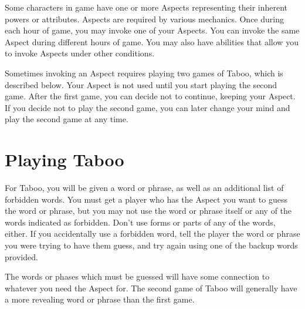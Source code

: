 \documentclass[green]{guardians}
\begin{document}
\name{\gAspect{}}

Some characters in game have one or more Aspects representing their inherent powers or attributes. Aspects are required by various mechanics. Once during each hour of game, you may invoke one of your Aspects. You can invoke the same Aspect during different hours of game. You may also have abilities that allow you to invoke Aspects under other conditions.

Sometimes invoking an Aspect requires playing two games of Taboo, which is described below. Your Aspect is not used until you start playing the second game. After the first game, you can decide not to continue, keeping your Aspect. If you decide not to play the second game, you can later change your mind and play the second game at any time.


\section*{Playing Taboo}

For Taboo, you will be given a word or phrase, as well as an additional list of forbidden words. You must get a player who has the Aspect you want to guess the word or phrase, but you may not use the word or phrase itself or any of the words indicated as forbidden. Don't use forms or parts of any of the words, either. If you accidentally use a forbidden word, tell the player the word or phrase you were trying to have them guess, and try again using one of the backup words provided.

The words or phases which must be guessed will have some connection to whatever you need the Aspect for. The second game of Taboo will generally have a more revealing word or phrase than the first game.
\end{document}

